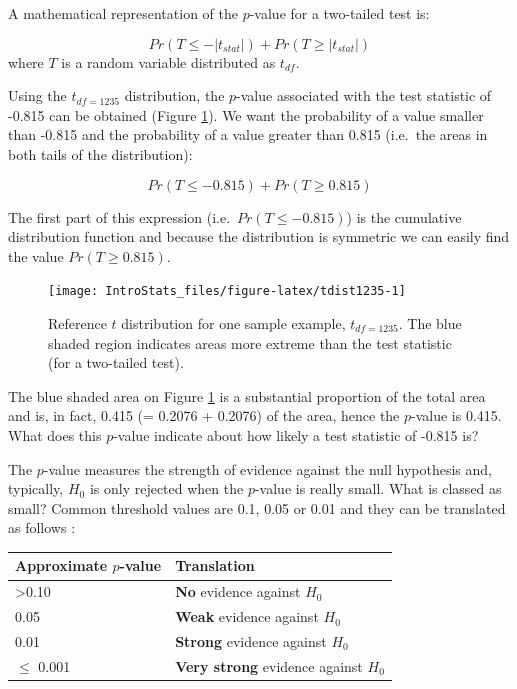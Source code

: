 \documentclass[
  oneside]{krantz}
\begin{document}
A mathematical representation of the \(p\)-value for a two-tailed test is:

\[Pr(T \le -|t_{stat}|) + Pr(T \ge |t_{stat}|) \]
where \(T\) is a random variable distributed as \(t_{df}\).

Using the \(t_{df=1235}\) distribution, the \(p\)-value associated with the test statistic of -0.815 can be obtained (Figure \ref{fig:tdist1235}). We want the probability of a value smaller than -0.815 and the probability of a value greater than 0.815 (i.e.~the areas in both tails of the distribution):

\[Pr(T \le -0.815) + Pr(T \ge 0.815) \]

The first part of this expression (i.e.~\(Pr(T \le -0.815)\)) is the cumulative distribution function and because the distribution is symmetric we can easily find the value \(Pr(T \ge 0.815)\).

\begin{figure}[!htb]

{\centering \texttt{[image: IntroStats\_files/figure-latex/tdist1235-1]} 

}

\caption{Reference $t$ distribution for one sample example, $t_{df=1235}$. The blue shaded region indicates areas more extreme than the test statistic (for a two-tailed test).}\label{fig:tdist1235}
\end{figure}

The blue shaded area on Figure \ref{fig:tdist1235} is a substantial proportion of the total area and is, in fact, 0.415 (= 0.2076 + 0.2076) of the area, hence the \(p\)-value is 0.415. What does this \(p\)-value indicate about how likely a test statistic of -0.815 is?

The \(p\)-value measures the strength of evidence against the null hypothesis and, typically, \(H_0\) is only rejected when the \(p\)-value is really small. What is classed as small? Common threshold values are 0.1, 0.05 or 0.01 and they can be translated as follows \citep{wildgaf}:

\begin{longtable}[]{@{}ll@{}}
\toprule
Approximate \(p\)-value & Translation\tabularnewline
\midrule
\endhead
\textgreater0.10 & \textbf{No} evidence against \(H_0\)\tabularnewline
0.05 & \textbf{Weak} evidence against \(H_0\)\tabularnewline
0.01 & \textbf{Strong} evidence against \(H_0\)\tabularnewline
\(\le\) 0.001 & \textbf{Very strong} evidence against \(H_0\)\tabularnewline
\bottomrule
\end{longtable}
\end{document}
